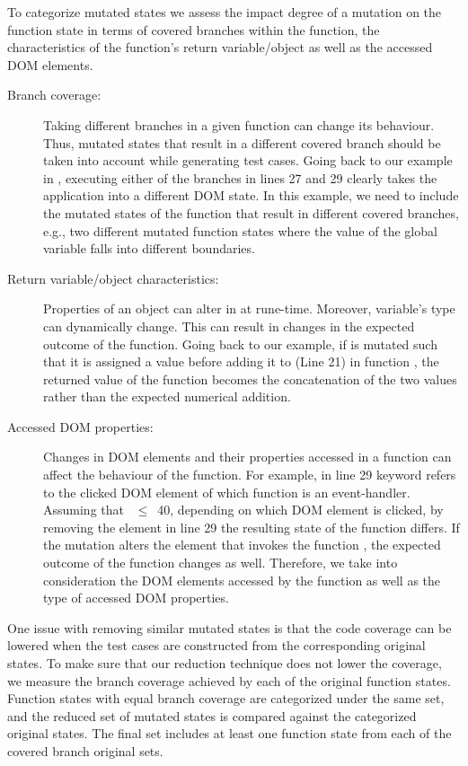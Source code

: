 

To categorize mutated states we assess the impact degree of a mutation on the function state in terms of covered branches within the function, the characteristics of the function's return variable/object as well as the accessed DOM elements.
\begin{description}%
\item[Branch coverage:] Taking different branches in a given function can change its behaviour. Thus, mutated states that result in a different covered branch should be taken into account while generating test cases. Going back to our example in , executing either of the branches in lines 27 and 29 clearly takes the application into a different DOM state. In this example, we need to include the  mutated states of the  function that result in different covered branches, e.g., two different mutated function states where the value of the 
global variable  falls into different boundaries. 
\item[Return variable/object characteristics:] Properties of an object can alter in \javascript at rune-time. Moreover, variable's type can dynamically change. This can result in changes in the expected outcome of the function. Going back to our example, if  is mutated such that it is assigned a  value before adding it to  (Line 21) in function , the returned value of the function becomes the  concatenation of the two values rather than the expected numerical addition. 
\item[Accessed DOM properties:] Changes in DOM elements and their properties accessed in a function can affect the behaviour of the function. For example, in line 29  keyword refers to the clicked DOM element of which function  is an event-handler. Assuming that ~$\leq$~40, depending on which DOM element is clicked, by removing the element in line 29 the resulting state of the function  differs. If the mutation alters the element that invokes the function , the expected outcome of the function changes as well. 
Therefore, we take into consideration the DOM elements accessed by the function as well as the type of accessed DOM properties.
\end{description}

One issue with removing similar mutated states is that the code coverage can be lowered when the test cases are constructed from the corresponding original states. To make sure that our reduction technique does not lower the coverage, we measure the branch coverage achieved by each of the original function states. Function states with equal branch coverage are categorized under the same set, and the reduced set of mutated states is compared against the categorized original states. The final set includes at least one function state from each of the covered branch original sets.

